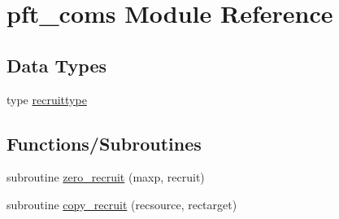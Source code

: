 \hypertarget{namespacepft__coms}{}\section{pft\+\_\+coms Module Reference}
\label{namespacepft__coms}
\subsection*{Data Types}
\begin{DoxyCompactItemize}
\item 
type \hyperlink{structpft__coms_1_1recruittype}{recruittype}
\end{DoxyCompactItemize}
\subsection*{Functions/\+Subroutines}
\begin{DoxyCompactItemize}
\item 
subroutine \hyperlink{namespacepft__coms_ab4e136720b91ff7a1087e0f0163dfacd}{zero\+\_\+recruit} (maxp, recruit)
\item 
subroutine \hyperlink{namespacepft__coms_a7d92f11102baa7fd26b952a5c9ea83fc}{copy\+\_\+recruit} (recsource, rectarget)
\end{DoxyCompactItemize}
